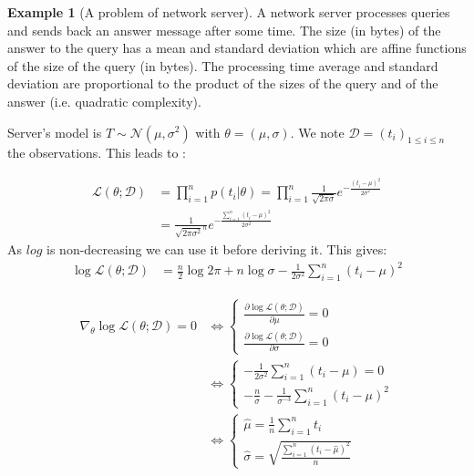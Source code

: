 \documentclass[12pt, a4paper]{article}
\theoremstyle{definition}
\newtheorem{example}{Example}[section]
\numberwithin{figure}{section}
\numberwithin{equation}{section}
\numberwithin{table}{section}
\begin{document}
\begin{example}[A problem of network server]
\label{ex:network_problem}
A network server processes queries and sends back an answer message after some time. The size (in bytes) of the answer to the query has a mean and standard deviation which are affine functions of the size of the query (in bytes). The processing time average and standard deviation are proportional to the product of the sizes of the query and of the answer (i.e. quadratic complexity).\\


Server's model is $T\sim \mathcal{N}(\mu,\sigma ^2)$ with $\theta=(\mu,\sigma)$. We note $\mathcal{D}=(t_i)_{1 \leq i \leq n}$ the observations. This leads to :

\begin{align}
\mathcal{L}(\theta; \mathcal{D})
&= \prod\limits_{i=1}^n p(t_i|\theta)=\prod\limits_{i=1}^n \frac{1}{\sqrt{2 \pi \sigma}}e^{-\frac{(t_i-\mu)^2}{2 \sigma^2}}\\
&=\frac{1}{{\sqrt{2 \pi \sigma^2}}^n}e^{-\frac{\sum_{i=1}^n(t_i-\mu)^2}{2 \sigma^2}}
\end{align}
As $log$ is non-decreasing we can use it before deriving it. This gives:
\begin{align}
\log \mathcal{L}(\theta; \mathcal{D})
&=\frac{n}{2}\log 2\pi + n\log \sigma - \frac{1}{2\sigma^2}\sum_{i=1}^n(t_i-\mu)^2
\end{align}

\begin{align}
\nabla_{\theta} \log \mathcal{L}(\theta; \mathcal{D}) = 0
&\Leftrightarrow
\left\{
\begin{array}{l}
\frac{\partial \log \mathcal{L}(\theta; \mathcal{D})}{\partial \mu} = 0 \\ [1em]
\frac{\partial \log \mathcal{L}(\theta; \mathcal{D})}{\partial \sigma} = 0
\end{array}
\right.
\\
&\Leftrightarrow
\left\{
\begin{array}{l}
- \frac{1}{2\sigma^2}\sum_{i=1}^n(t_i-\mu) = 0 \\ [1em]
- \frac{n}{\sigma}-\frac{1}{\sigma^{-3}}\sum_{i=1}^n(t_i-\mu)^2
\end{array}
\right.
\\
&\Leftrightarrow
\left\{
\begin{array}{l}
    \hat\mu=\frac{1}{n}\sum_{i=1}^n t_i \\ [1em]
    \hat\sigma=\sqrt{\frac{\sum_{i=1}^n(t_i-\hat\mu)^2}{n}}
\end{array}
\right.
\end{align}
\end{example}
\end{document}

